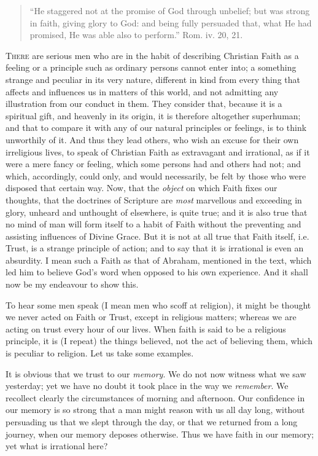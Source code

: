 
\begin{quote}

``He staggered not at the promise of God
through unbelief; but was strong in faith, giving
glory to God: and being fully persuaded that, what He
had promised, He was able also to perform.'' Rom.
iv. 20, 21.

\end{quote}

T\textsc{here} are serious men who are in the habit of
describing Christian Faith as a feeling or a principle
such as ordinary persons cannot enter into; a something
strange and peculiar in its very nature, different in
kind from every thing that affects and influences us in
matters of this world, and not admitting any illustration
from our conduct in them. They consider that, because it
is a spiritual gift, and heavenly in its origin, it is
therefore altogether superhuman; and that to compare it
with any of our natural principles or feelings, is to
think unworthily of it. And thus they lead others, who
wish an excuse for their own irreligious lives, to speak
of Christian Faith as extravagant and irrational, as if
it were a mere fancy or feeling, which some persons had
and others had not; and which, accordingly, could only,
and would necessarily, be felt by those who were disposed
that certain way. Now, that the \emph{object} on which
Faith fixes our thoughts, that the doctrines of Scripture
are \emph{most} marvellous and exceeding in glory,
unheard and unthought of elsewhere, is quite true; and it
is also true that no mind of man will form itself to a
habit of Faith without the preventing and assisting
influences of Divine Grace. But it is not at all true
that Faith itself, i.e. Trust, is a strange principle of
action; and to say that it is irrational is even an
absurdity. I mean such a Faith as that of Abraham,
mentioned in the text, which led him to believe God's
word when opposed to his own experience. And it shall now
be my endeavour to show this.

To hear some men speak (I mean men who scoff at
religion), it might be thought we never acted on Faith or
Trust, except in religious matters; whereas we are acting
on trust every hour of our lives. When faith is said to
be a religious principle, it is (I repeat) the things
believed, not the act of believing them, which is
peculiar to religion. Let us take some examples.

It is obvious that we trust to our \emph{memory}. We
do not now witness what we saw yesterday; yet we have no
doubt it took place in the way we \emph{remember}. We
recollect clearly the circumstances of morning and
afternoon. Our confidence in our memory is so strong that
a man might reason with us all day long, without
persuading us that we slept through the day, or that we
returned from a long journey, when our memory deposes
otherwise. Thus we have faith in our memory; yet what is
irrational here?

